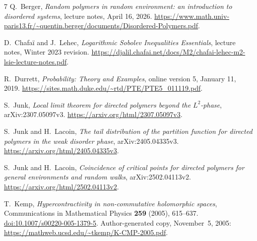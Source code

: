 \documentclass[11pt]{amsart}
\theoremstyle{remark}
\numberwithin{equation}{section}
\begin{document}
\begin{thebibliography}{7}
Q.~Berger, \emph{Random polymers in random environment: an introduction to
disordered systems}, lecture notes, April 16, 2026.
\url{https://www.math.univ-paris13.fr/~quentin.berger/documents/Disordered-Polymers.pdf}.

D.~Chafa\"i and J.~Lehec, \emph{Logarithmic Sobolev Inequalities Essentials},
lecture notes, Winter 2023 revision.
\url{https://djalil.chafai.net/docs/M2/chafai-lehec-m2-lsie-lecture-notes.pdf}.

R.~Durrett, \emph{Probability: Theory and Examples}, online version 5,
January 11, 2019.
\url{https://sites.math.duke.edu/~rtd/PTE/PTE5_011119.pdf}.

S.~Junk, \emph{Local limit theorem for directed polymers beyond the
$L^2$-phase}, arXiv:2307.05097v3.
\url{https://arxiv.org/html/2307.05097v3}.

S.~Junk and H.~Lacoin, \emph{The tail distribution of the partition function
for directed polymers in the weak disorder phase}, arXiv:2405.04335v3.
\url{https://arxiv.org/html/2405.04335v3}.

S.~Junk and H.~Lacoin, \emph{Coincidence of critical points for directed
polymers for general environments and random walks}, arXiv:2502.04113v2.
\url{https://arxiv.org/html/2502.04113v2}.

T.~Kemp, \emph{Hypercontractivity in non-commutative holomorphic spaces},
Communications in Mathematical Physics \textbf{259} (2005), 615--637.
\href{https://doi.org/10.1007/s00220-005-1379-5}{doi:10.1007/s00220-005-1379-5}.
Author-generated copy, November~5, 2005:
\url{https://mathweb.ucsd.edu/~tkemp/K-CMP-2005.pdf}.
\end{thebibliography}
\end{document}
